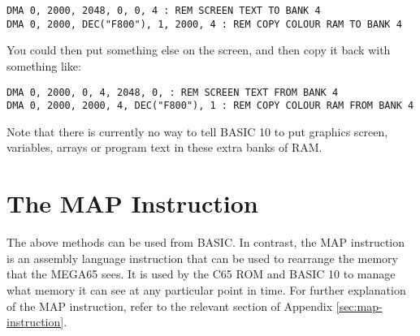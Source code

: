 \begin{tcolorbox}[colback=black,coltext=white]
\verbatimfont{\codefont}
\begin{verbatim}
DMA 0, 2000, 2048, 0, 0, 4 : REM SCREEN TEXT TO BANK 4
DMA 0, 2000, DEC("F800"), 1, 2000, 4 : REM COPY COLOUR RAM TO BANK 4
\end{verbatim}
\end{tcolorbox}

You could then put something else on the screen, and then copy it back with something like:

\begin{tcolorbox}[colback=black,coltext=white]
\verbatimfont{\codefont}
\begin{verbatim}
DMA 0, 2000, 0, 4, 2048, 0, : REM SCREEN TEXT FROM BANK 4
DMA 0, 2000, 2000, 4, DEC("F800"), 1 : REM COPY COLOUR RAM FROM BANK 4
\end{verbatim}
\end{tcolorbox}

Note that there is currently no way to tell BASIC 10 to put graphics screen, variables,
arrays or program text in these extra banks of RAM.

\section{The MAP Instruction}

The above methods can be used from BASIC. In contrast, the MAP instruction is an assembly
language instruction that can be used to rearrange the memory that the MEGA65 sees.
It is used by the C65 ROM and BASIC 10 to manage what memory it can see at any particular
point in time.  For further explanation of the MAP instruction, refer to the relevant section of Appendix \ref{sec:map-instruction}.



